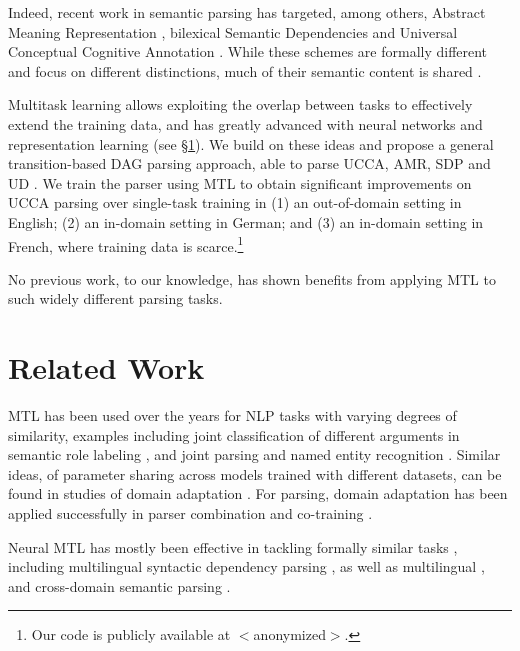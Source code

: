 \documentclass[11pt,a4paper]{article}
\begin{document}
Indeed, recent work in semantic parsing has targeted, among others,
Abstract Meaning Representation \cite[AMR;][]{banarescu2013abstract},
bilexical Semantic Dependencies \cite[SDP;][]{oepen2016towards}
and Universal Conceptual Cognitive Annotation \cite[UCCA;][]{abend2013universal}.
While these schemes are formally different and focus on different distinctions,
much of their semantic content is shared \cite{abend2017state}.

Multitask learning \cite[MTL; ][]{caruana1998multitask} allows exploiting the overlap between tasks
to effectively extend the training data, 
and has greatly advanced with neural networks and representation learning
(see \S\ref{sec:related_work}).
We build on these ideas and propose a general transition-based DAG parsing approach,
able to parse UCCA, AMR, SDP and UD \cite{nivre2016universal}.
We train the parser using MTL to obtain significant improvements
on UCCA parsing over single-task training in
(1) an out-of-domain setting in English; 
(2) an in-domain setting in German; and
(3) an in-domain setting in French, where training data is
scarce.\footnote{Our code is publicly available at $<$anonymized$>$.}

No previous work, to our knowledge, has shown benefits 
from applying MTL to such widely different parsing tasks.

\section{Related Work}\label{sec:related_work}

MTL has been used over the years for NLP tasks with varying degrees of similarity,
examples including joint classification of different arguments in 
semantic role labeling \cite{toutanova2005joint},
and joint parsing and named entity recognition \cite{Finkel2009JointPA}.
Similar ideas, of parameter sharing across models trained with different datasets,
can be found in studies of domain adaptation \cite{W06-1615,P07-1033,K17-1040}.
For parsing, domain adaptation has been applied successfully in
parser combination and co-training \cite{mcclosky2010automatic,baucom2013domain}.

Neural MTL has mostly been effective in tackling formally similar
tasks \cite{P16-2038},
including
multilingual syntactic dependency parsing \cite{Q16-1031,guo2016exploiting},
as well as multilingual \cite{duong2017multilingual},
and cross-domain semantic parsing \cite{herzig-berant:2017:Short,W17-2607}.
\end{document}
